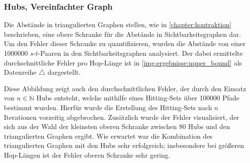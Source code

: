 \subsubsection{Hubs, Vereinfachter Graph}


Die Abstände in triangulierten Graphen stellen, wie in \autoref{chapter:kontraktion} beschrieben, eine obere Schranke für die Abstände in Sichtbarkeitsgraphen dar.
Um den Fehler dieser Schranke zu quantifizieren, wurden die Abstände von einer \num{1000000} $s$-$t$-Paaren in den Sichtbarkeitsgraphen analysiert.
Der dabei ermittelte durchschnittliche Fehler pro Hop-Länge ist in \autoref{img:ergebnisse:upper_bound} als Datenreihe $\triangle$ dargestellt.

Diese Abbildung zeigt auch den durchschnittlichen Fehler, der durch den Einsatz von $n \in \mathbb{N}$ Hubs entsteht, welche mithilfe eines Hitting-Sets über \num{100000} Pfade bestimmt wurden.
Hierfür wurde die Erstellung des Hitting-Sets nach $n$ Iterationen vorzeitig abgebrochen.
Zusätzlich wurde der Fehler visualisiert, der sich aus der Wahl der kleinsten oberen Schranke zwischen 80 Hubs und den triangulierten Graphen ergibt.
Wie erwartet war die Kombination des triangulierten Graphen mit den Hubs sehr erfolgreich; insbesondere bei größeren Hop-Längen ist der Fehler oberen Schranke sehr gering.

